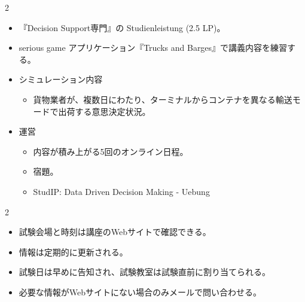 \clearpage



\vspace{1.5mm}

\begin{multicols}{2}

\footnotesize

\raggedcolumns


\begin{itemize}
\item 『Decision Support専門』の Studienleistung (2.5 LP)。
\item serious game アプリケーション『Trucks and Barges』で講義内容を練習する。
\item シミュレーション内容
\begin{itemize}
\item 貨物業者が、複数日にわたり、ターミナルからコンテナを異なる輸送モードで出荷する意思決定状況。
\end{itemize}
\item 運営
\begin{itemize}
\item 内容が積み上がる5回のオンライン日程。
\item 宿題。
\item StudIP: Data Driven Decision Making - Uebung
\end{itemize}
\end{itemize}

\end{multicols}

\clearpage



\vspace{1.5mm}

\begin{multicols}{2}

\footnotesize

\raggedcolumns


\begin{itemize}
\item 試験会場と時刻は講座のWebサイトで確認できる。
\item 情報は定期的に更新される。
\item 試験日は早めに告知され、試験教室は試験直前に割り当てられる。
\item 必要な情報がWebサイトにない場合のみメールで問い合わせる。
\end{itemize}

\end{multicols}

